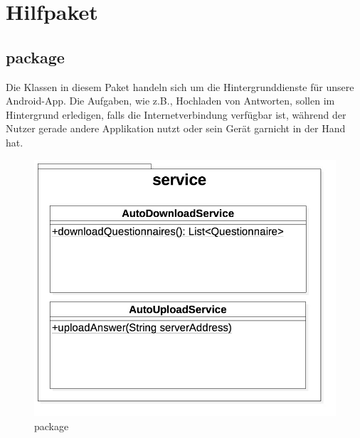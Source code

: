 \documentclass[a4paper]{scrreprt}
\begin{document}
{        \newpage
        \section{Hilfpaket}


            \subsection{package }

                Die Klassen in diesem Paket handeln sich um die Hintergrunddienste für unsere Android-App. Die Aufgaben, wie z.B., Hochladen von Antworten, sollen im Hintergrund erledigen, falls die Internetverbindung verfügbar ist, während der Nutzer gerade andere Applikation nutzt oder sein Gerät garnicht in der Hand hat.

                \vspace*{0.5cm}
                \begin{figure}[H]
                    \centering
                    \includegraphics[scale = 0.5]{service.jpg}
                    \caption{package }
                \end{figure}

}
\end{document}

